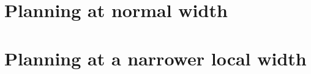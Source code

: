 \documentclass{article}
\begin{document}
\section*{Planning at normal width}

\clearpage
\section*{Planning at a narrower local width}
\begingroup
\noindent\begin{minipage}{.62\linewidth}
\renewcommand{\label}[1]{}

\end{minipage}
\endgroup
\end{document}
